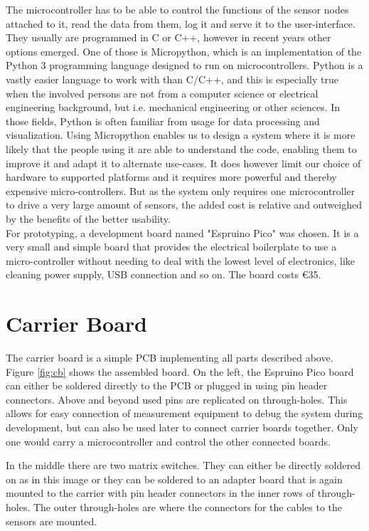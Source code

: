 The microcontroller has to be able to control the functions of the sensor nodes attached to it, read the data from them, log it and serve it to the user-interface. They usually are programmed in C or C++, however in recent years other options emerged. One of those is Micropython, which is an implementation of the Python 3 programming language designed to run on microcontrollers. Python is a vastly easier language to work with than C/C++, and this is especially true when the involved persons are not from a computer science or electrical engineering background, but i.e. mechanical engineering or other sciences. In those fields, Python is often familiar from usage for data processing and visualization. Using Micropython enables us to design a system where it is more likely that the people using it are able to understand the code, enabling them to improve it and adapt it to alternate use-cases.
It does however limit our choice of hardware to supported platforms and it requires more powerful and thereby expensive micro-controllers. But as the system only requires one microcontroller to drive a very large amount of sensors, the added cost is relative and outweighed by the benefits of the better usability.\\

For prototyping, a development board named "Espruino Pico" was chosen. It is a very small and simple board that provides the electrical boilerplate to use a micro-controller without needing to deal with the lowest level of electronics, like cleaning power supply, USB connection and so on. The board costs \euro{35}.\\

\section{Carrier Board}

The carrier board is a simple PCB implementing all parts described above. Figure \ref{fig:cb} shows the assembled board. On the left, the Espruino Pico board can either be soldered directly to the PCB or plugged in using pin header connectors. Above and beyond used pins are replicated on through-holes. This allows for easy connection of measurement equipment to debug the system during development, but can also be used later to connect carrier boards together. Only one would carry a microcontroller and control the other connected boards.

In the middle there are two matrix switches. They can either be directly soldered on as in this image or they can be soldered to an adapter board that is again mounted to the carrier with pin header connectors in the inner rows of through-holes.  The outer through-holes are where the connectors for the cables to the sensors are mounted.


